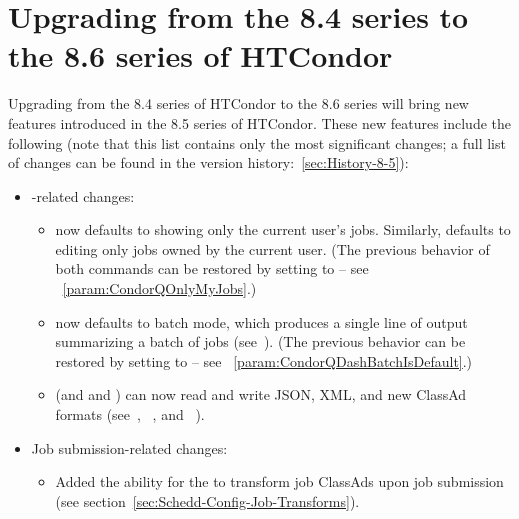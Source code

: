\section{Upgrading from the 8.4 series to the 8.6 series of HTCondor}\label{sec:to-8.6}

Upgrading from the 8.4 series of HTCondor to the 8.6 series
will bring new features introduced in the 8.5 series of HTCondor.
These new features include the following (note that this list contains
only the most significant changes; a full list of changes can be
found in the version history:~\ref{sec:History-8-5}):

\begin{itemize}

\item {}-related changes:
  \begin{itemize}

  \item {} now defaults to showing only the current user's jobs.
  Similarly,  defaults to editing only jobs owned by the
  current user.  
  (The previous behavior of both commands can be restored by setting
   to  --
  see ~\ref{param:CondorQOnlyMyJobs}.)

  \item {} now defaults to batch mode, which produces a single
  line of output summarizing a batch of jobs (see~\pageref{batches-of-jobs}).
  (The previous behavior can be restored by setting
   to  --
  see ~\ref{param:CondorQDashBatchIsDefault}.)

  \item {} (and  and ) can now
  read and write JSON, XML, and new ClassAd formats
  (see~\pageref{man-condor-q}, ~\pageref{man-condor-history},
  and ~\pageref{man-condor-status}).

  \end{itemize}

\item Job submission-related changes:
  \begin{itemize}

   \item Added the ability for the  to transform
   job ClassAds upon job submission
   (see section~\ref{sec:Schedd-Config-Job-Transforms}).


\end{itemize}
\end{itemize}
